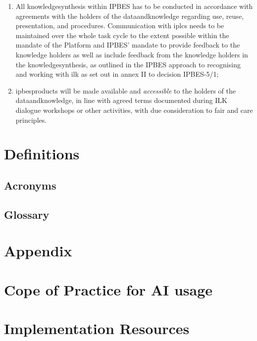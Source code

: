 \documentclass{article}
\begin{document}
\begin{enumerate}[label=(\alph*)]
    \item All \gls{knowledgesynthesis} within IPBES has to be conducted in accordance with agreements with the holders of the \gls{dataandknowledge} regarding use, reuse, presentation, and procedures. Communication with \glspl{iplc} needs to be maintained over the whole \gls{task} cycle to the extent possible within the mandate of the Platform and IPBES’ mandate to provide feedback to the \gls{knowledge} holders as well as include feedback from the \gls{knowledge} holders in the \gls{knowledgesynthesis}, as outlined in the IPBES approach to recognising and working with \gls{ilk} as set out in annex II to decision IPBES-5/1;

    \item \glspl{ipbesproduct} will be made available and \textit{accessible} to the holders of the \gls{dataandknowledge}, in line with agreed terms documented during ILK dialogue workshops or other activities, with due consideration to \gls{fair} and \gls{care} principles.
\end{enumerate}



\section{Definitions}
\subsection{Acronyms}

\printglossary[type=\acronymtype]

\subsection{Glossary}

\printglossary

\appendix
\section*{Appendix}

\section{Cope of Practice for AI usage}

\section{Implementation Resources}
\end{document}
